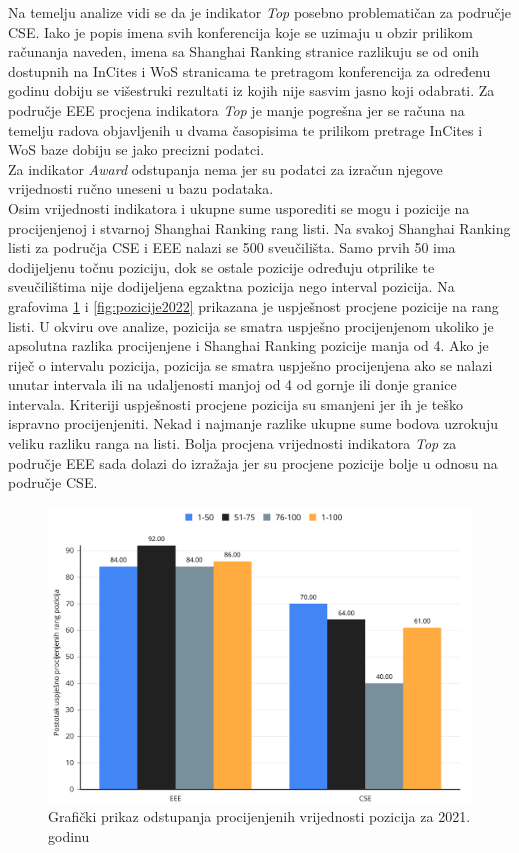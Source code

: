 \documentclass[times, utf8, zavrsni]{fer}
\begin{document}
Na temelju analize vidi se da je indikator \emph{Top} posebno problematičan za područje CSE. Iako je popis imena svih konferencija koje se uzimaju u obzir
prilikom računanja naveden, imena sa Shanghai Ranking stranice razlikuju se od onih dostupnih 
na InCites i WoS stranicama te pretragom konferencija za određenu godinu dobiju se višestruki rezultati iz kojih nije sasvim jasno koji odabrati. Za područje EEE procjena 
indikatora \emph{Top} je manje pogrešna jer se računa na temelju radova objavljenih u dvama časopisima te prilikom pretrage InCites i WoS baze dobiju se jako precizni podatci.
\\Za indikator \emph{Award} odstupanja nema jer su podatci za izračun njegove vrijednosti ručno uneseni u bazu podataka.
\\Osim vrijednosti indikatora i ukupne sume  usporediti se mogu i pozicije na procijenjenoj i stvarnoj Shanghai Ranking rang listi.
Na svakoj Shanghai Ranking listi za područja CSE i EEE nalazi se 500 sveučilišta. Samo prvih 50 ima dodijeljenu točnu poziciju, dok se ostale pozicije određuju
otprilike te sveučilištima nije dodijeljena egzaktna pozicija nego interval pozicija. Na grafovima \ref{fig:pozicije2021} i \ref{fig:pozicije2022}
prikazana je uspješnost procjene pozicije na rang listi. U okviru ove analize, 
pozicija se smatra uspješno procijenjenom ukoliko je apsolutna razlika procijenjene i Shanghai Ranking pozicije manja od 4. Ako je riječ o intervalu pozicija, 
pozicija se smatra uspješno procijenjena ako se nalazi unutar intervala ili na udaljenosti manjoj od 4 od gornje ili donje granice intervala. Kriteriji uspješnosti 
procjene pozicija su smanjeni jer ih je teško ispravno procijenjeniti. Nekad i najmanje razlike ukupne sume bodova uzrokuju veliku razliku ranga na listi. 
Bolja procjena vrijednosti indikatora \emph{Top} za područje EEE sada dolazi do izražaja jer su procjene pozicije bolje u odnosu na područje CSE.
\begin{figure}[htb]
    \centering
    \includegraphics[scale=0.25]{pozicije2021.png}
    \caption{Grafički prikaz odstupanja procijenjenih vrijednosti pozicija za 2021. godinu}
    \label{fig:pozicije2021}
    \end{figure} 
\end{document}
